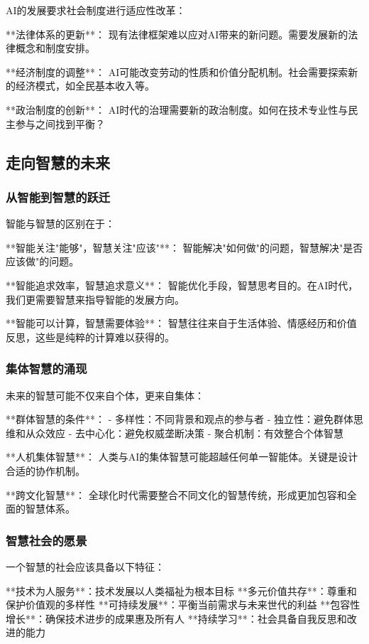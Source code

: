 AI的发展要求社会制度进行适应性改革：

**法律体系的更新**：
现有法律框架难以应对AI带来的新问题。需要发展新的法律概念和制度安排。

**经济制度的调整**：
AI可能改变劳动的性质和价值分配机制。社会需要探索新的经济模式，如全民基本收入等。

**政治制度的创新**：
AI时代的治理需要新的政治制度。如何在技术专业性与民主参与之间找到平衡？

\subsection{走向智慧的未来} %

\subsubsection{从智能到智慧的跃迁}

智能与智慧的区别在于：

**智能关注"能够"，智慧关注"应该"**：
智能解决"如何做"的问题，智慧解决"是否应该做"的问题。

**智能追求效率，智慧追求意义**：
智能优化手段，智慧思考目的。在AI时代，我们更需要智慧来指导智能的发展方向。

**智能可以计算，智慧需要体验**：
智慧往往来自于生活体验、情感经历和价值反思，这些是纯粹的计算难以获得的。

\subsubsection{集体智慧的涌现}

未来的智慧可能不仅来自个体，更来自集体：

**群体智慧的条件**：
- 多样性：不同背景和观点的参与者
- 独立性：避免群体思维和从众效应
- 去中心化：避免权威垄断决策
- 聚合机制：有效整合个体智慧

**人机集体智慧**：
人类与AI的集体智慧可能超越任何单一智能体。关键是设计合适的协作机制。

**跨文化智慧**：
全球化时代需要整合不同文化的智慧传统，形成更加包容和全面的智慧体系。

\subsubsection{智慧社会的愿景}

一个智慧的社会应该具备以下特征：

**技术为人服务**：技术发展以人类福祉为根本目标
**多元价值共存**：尊重和保护价值观的多样性
**可持续发展**：平衡当前需求与未来世代的利益
**包容性增长**：确保技术进步的成果惠及所有人
**持续学习**：社会具备自我反思和改进的能力

